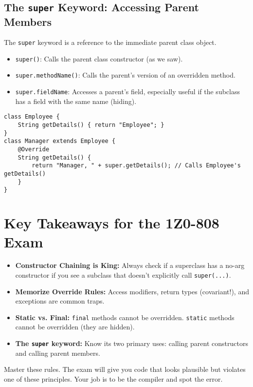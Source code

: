 \documentclass[12pt]{article}
\begin{document}
\begin{enumerate}[label=(\arabic*)]
\subsection{The \texttt{super} Keyword: Accessing Parent Members}
The \texttt{super} keyword is a reference to the immediate parent class object.
\begin{itemize}
    \item \texttt{super()}: Calls the parent class constructor (as we saw).
    \item \texttt{super.methodName()}: Calls the parent's version of an overridden method.
    \item \texttt{super.fieldName}: Accesses a parent's field, especially useful if the subclass has a field with the same name (hiding).
\end{itemize}
\begin{verbatim}
class Employee {
    String getDetails() { return "Employee"; }
}
class Manager extends Employee {
    @Override
    String getDetails() {
        return "Manager, " + super.getDetails(); // Calls Employee's getDetails()
    }
}
\end{verbatim}

\section*{Key Takeaways for the 1Z0-808 Exam}
\begin{itemize}
    \item \textbf{Constructor Chaining is King:} Always check if a superclass has a no-arg constructor if you see a subclass that doesn't explicitly call \texttt{super(...)}.
    \item \textbf{Memorize Override Rules:} Access modifiers, return types (covariant!), and exceptions are common traps.
    \item \textbf{Static vs. Final:} \texttt{final} methods cannot be overridden. \texttt{static} methods cannot be overridden (they are hidden).
    \item \textbf{The \texttt{super} keyword:} Know its two primary uses: calling parent constructors and calling parent members.
\end{itemize}
Master these rules. The exam will give you code that looks plausible but violates one of these principles. Your job is to be the compiler and spot the error.
\end{enumerate}
\end{document}
